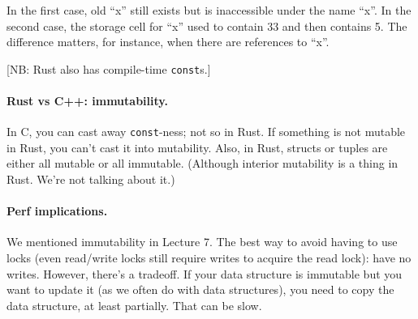 In the first case, old ``x'' still exists but is inaccessible under the name ``x''.
In the second case, the storage cell for ``x'' used to contain 33 and then contains 5.
The difference matters, for instance, when there are references to ``x''.

[NB: Rust also has compile-time {\tt const}s.]

\paragraph{Rust vs C++: immutability.} In C, you can cast away {\tt const}-ness; not so in Rust.
If something is not mutable in Rust, you can't cast it into mutability. Also, in Rust, structs or
tuples are either all mutable or all immutable. (Although interior mutability is a thing in Rust. We're
not talking about it.)

\paragraph{Perf implications.}
We mentioned immutability in Lecture 7. The best way to avoid having
to use locks (even read/write locks still require writes to acquire
the read lock): have no writes.  However, there's a tradeoff. If your
data structure is immutable but you want to update it (as we often do
with data structures), you need to copy the data structure, at least
partially. That can be slow.




